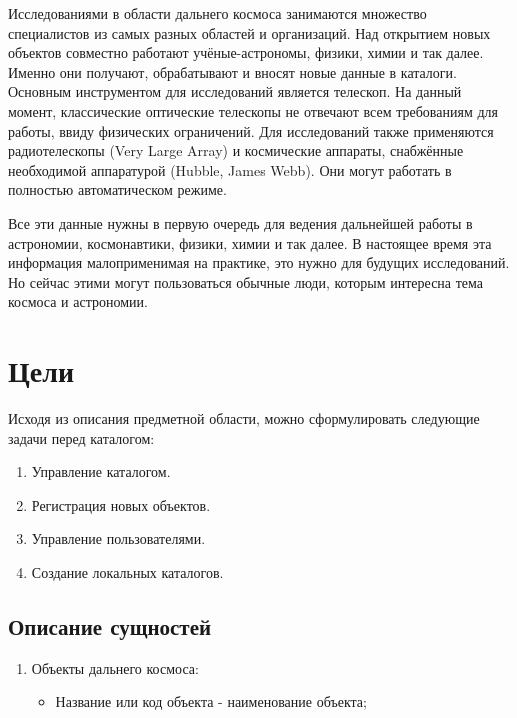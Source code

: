 \documentclass[14pt]{extreport}
\begin{document}
{        Исследованиями в области дальнего космоса занимаются множество специалистов из самых разных областей и организаций. Над открытием новых объектов совместно работают учёные-астрономы, физики, химии и так далее. Именно они получают, обрабатывают и вносят новые данные в каталоги. Основным инструментом для исследований является телескоп. На данный момент, классические оптические телескопы не отвечают всем требованиям для работы, ввиду физических ограничений. Для исследований также применяются радиотелескопы (Very Large Array) и космические аппараты, снабжённые необходимой аппаратурой (Hubble, James Webb). Они могут работать в полностью автоматическом режиме.

        Все эти данные нужны в первую очередь для ведения дальнейшей работы в астрономии, космонавтики, физики, химии и так далее. В настоящее время эта информация малоприменимая на практике, это нужно для будущих исследований. Но сейчас этими могут пользоваться обычные люди, которым интересна тема космоса и астрономии.

        \newpage

        \section{Цели}

        Исходя из описания предметной области, можно сформулировать следующие задачи перед каталогом:

        \begin{enumerate}
        \item Управление каталогом.

        \item Регистрация новых объектов.

        \item Управление пользователями.

        \item Создание локальных каталогов.
        \end{enumerate}

        \subsection{Описание сущностей}

        \begin{enumerate}
        
        \item Объекты дальнего космоса:

        \begin{itemize}
            \item Название или код объекта - наименование объекта;
        

\end{itemize}
\end{enumerate}}
\end{document}
